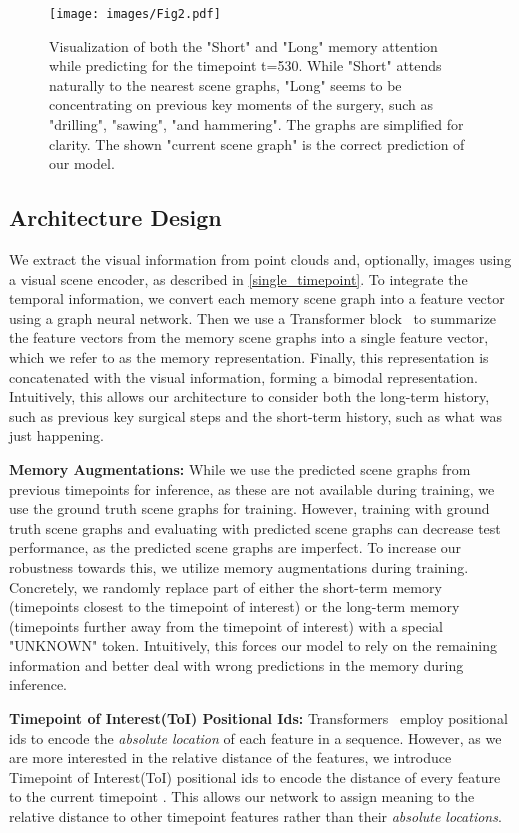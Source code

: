 \documentclass[runningheads]{llncs}
\begin{document}
\begin{figure}[hbt!]
	\centering
	\texttt{[image: images/Fig2.pdf]}
	\caption{Visualization of both the "Short" and "Long" memory attention while predicting for the timepoint t=530. While "Short" attends naturally to the nearest scene graphs, "Long" seems to be concentrating on previous key moments of the surgery, such as "drilling", "sawing", "and hammering". The graphs are simplified for clarity. The shown "current scene graph" is the correct prediction of our model.}
	\label{fig:attention_visualization}
\end{figure}

\subsection{Architecture Design}
We extract the visual information from point clouds and, optionally, images using a visual scene encoder, as described in \ref{single_timepoint}. To integrate the temporal information, we convert each memory scene graph into a feature vector using a graph neural network. Then we use a Transformer block~\cite{transformers} to summarize the feature vectors from the  memory scene graphs into a single feature vector, which we refer to as the memory representation. Finally, this representation is concatenated with the visual information, forming a bimodal representation. Intuitively, this allows our architecture to consider both the long-term history, such as previous key surgical steps and the short-term history, such as what was just happening. 

\noindent \textbf{Memory Augmentations:}
While we use the predicted scene graphs from previous timepoints for inference, as these are not available during training, we use the ground truth scene graphs for training. However, training with ground truth scene graphs and evaluating with predicted scene graphs can decrease test performance, as the predicted scene graphs are imperfect. To increase our robustness towards this, we utilize memory augmentations during training. Concretely, we randomly replace part of either the short-term memory (timepoints closest to the timepoint of interest) or the long-term memory (timepoints further away from the timepoint of interest) with a special "UNKNOWN" token. Intuitively, this forces our model to rely on the remaining information and better deal with wrong predictions in the memory during inference. 

\noindent \textbf{Timepoint of Interest(ToI) Positional Ids:}
Transformers~\cite{transformers} employ positional ids to encode the \textit{absolute location} of each feature in a sequence. However, as we are more interested in the relative distance of the features, we introduce Timepoint of Interest(ToI) positional ids to encode the distance of every feature to the current timepoint . This allows our network to assign meaning to the relative distance to other timepoint features rather than their \textit{absolute locations}.
\end{document}
